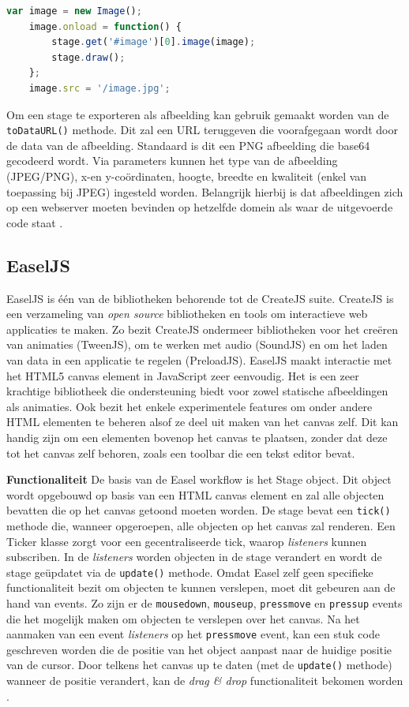 \begin{lstlisting}[language=javascript]
	var image = new Image();
    image.onload = function() {
        stage.get('#image')[0].image(image);
        stage.draw();
    };
    image.src = '/image.jpg';
\end{lstlisting}

Om een stage te exporteren als afbeelding kan gebruik gemaakt worden van de \lstinline{toDataURL()} methode. Dit zal een URL teruggeven die voorafgegaan wordt door de data van de afbeelding. Standaard is dit een PNG afbeelding die base64 gecodeerd wordt. Via parameters kunnen het type van de afbeelding (JPEG/PNG), x-en y-co\"{o}rdinaten, hoogte, breedte en kwaliteit (enkel van toepassing bij JPEG) ingesteld worden. Belangrijk hierbij is dat afbeeldingen zich op een webserver moeten bevinden op hetzelfde domein als waar de uitgevoerde code staat \cite{KonvaToImage}. 

\subsection{EaselJS}
EaselJS is \'{e}\'{e}n van de bibliotheken behorende tot de CreateJS suite. CreateJS is een verzameling van \textit{open source} bibliotheken en tools om interactieve web applicaties te maken. Zo bezit CreateJS ondermeer bibliotheken voor het cre\"{e}ren van animaties (TweenJS), om te werken met audio (SoundJS) en om het laden van data in een applicatie te regelen (PreloadJS). EaselJS maakt interactie met het HTML5 canvas element in JavaScript zeer eenvoudig. Het is een zeer krachtige bibliotheek die ondersteuning biedt voor zowel statische afbeeldingen als animaties. Ook bezit het enkele experimentele features om onder andere HTML elementen te beheren alsof ze deel uit maken van het canvas zelf. Dit kan handig zijn om een elementen bovenop het canvas te plaatsen, zonder dat deze tot het canvas zelf behoren, zoals een toolbar die een tekst editor bevat. 

\textbf{Functionaliteit} \break
De basis van de Easel workflow is het Stage object. Dit object wordt opgebouwd op basis van een HTML canvas element en zal alle objecten bevatten die op het canvas getoond moeten worden. De stage bevat een \lstinline{tick()} methode die, wanneer opgeroepen, alle objecten op het canvas zal renderen. Een Ticker klasse zorgt voor een gecentraliseerde tick, waarop \textit{listeners} kunnen subscriben. In de \textit{listeners} worden objecten in de stage verandert en wordt de stage ge\"{u}pdatet via de \lstinline{update()} methode. Omdat Easel zelf geen specifieke functionaliteit bezit om objecten te kunnen verslepen, moet dit gebeuren aan de hand van events. Zo zijn er de \lstinline{mousedown}, \lstinline{mouseup}, \lstinline{pressmove} en \lstinline{pressup} events die het mogelijk maken om objecten te verslepen over het canvas. Na het aanmaken van een event \textit{listeners} op het \lstinline{pressmove} event, kan een stuk code geschreven worden die de positie van het object aanpast naar de huidige positie van de cursor. Door telkens het canvas up te daten (met de \lstinline{update()} methode) wanneer de positie verandert, kan de \textit{drag \& drop} functionaliteit bekomen worden \cite{EaselMouseInteraction}.  

